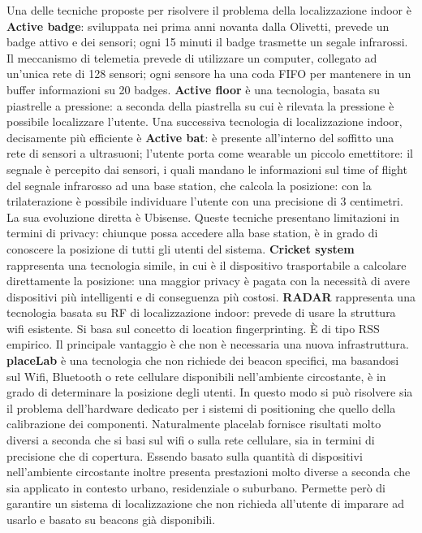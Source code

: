 Una delle tecniche proposte per risolvere il problema della localizzazione
indoor è \textbf{Active badge}: sviluppata nei prima anni novanta dalla
Olivetti, prevede un badge attivo e dei sensori; ogni 15 minuti il badge
trasmette un segale infrarossi. Il meccanismo di telemetia prevede di utilizzare
un computer, collegato ad un'unica rete di 128 sensori; ogni sensore ha una coda
FIFO per mantenere in un buffer informazioni su 20 badges.
\bigbreak
\textbf{Active floor} è una tecnologia, basata su piastrelle a pressione: a
seconda della piastrella su cui è rilevata la pressione è possibile localizzare
l'utente.
\bigbreak
Una successiva tecnologia di localizzazione indoor, decisamente più efficiente è
\textbf{Active bat}: è presente all'interno del soffitto una rete di sensori a
ultrasuoni; l'utente porta come wearable un piccolo emettitore: il segnale è
percepito dai sensori, i quali mandano le informazioni sul time of flight del
segnale infrarosso ad una base station, che calcola la posizione: con la
trilaterazione è possibile individuare l'utente con una precisione di 3
centimetri.
La sua evoluzione diretta è Ubisense.
\bigbreak
Queste tecniche presentano limitazioni in termini di privacy: chiunque possa
accedere alla base station, è in grado di conoscere la posizione di tutti gli
utenti del sistema. \textbf{Cricket system} rappresenta una tecnologia simile,
in cui è il dispositivo trasportabile a calcolare direttamente la posizione: una
maggior privacy è pagata con la necessità di avere dispositivi più intelligenti
e di conseguenza più costosi.
\bigbreak
\textbf{RADAR} rappresenta una tecnologia basata su RF di localizzazione indoor:
prevede di usare la struttura wifi esistente. Si basa sul concetto di location
fingerprinting. È di tipo RSS empirico. Il principale vantaggio è che non è
necessaria una nuova infrastruttura.
\bigbreak
\textbf{placeLab} è una tecnologia che non richiede dei beacon specifici, ma
basandosi sul Wifi, Bluetooth o rete cellulare disponibili nell'ambiente
circostante, è in grado di determinare la posizione degli utenti. In questo modo
si può risolvere sia il problema dell'hardware dedicato per i sistemi di
positioning che quello della calibrazione dei componenti.
Naturalmente placelab fornisce risultati molto diversi a seconda che si basi sul
wifi o sulla rete cellulare, sia in termini di precisione che di copertura.
Essendo basato sulla quantità di dispositivi nell'ambiente circostante inoltre
presenta prestazioni molto diverse a seconda che sia applicato in contesto
urbano, residenziale o suburbano.
Permette però di garantire un sistema di localizzazione che non richieda
all'utente di imparare ad usarlo e basato su beacons già disponibili.

